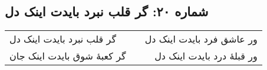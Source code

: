 \begin{center}
\section*{شماره ۲۰: گر قلب نبرد بایدت اینک دل}
\label{sec:020}
\begin{longtable}{l p{0.5cm} r}
گر قلب نبرد بایدت اینک دل
&&
ور عاشق فرد بایدت اینک دل
\\
گر کعبهٔ شوق بایدت اینک جان
&&
ور قبلهٔ درد بایدت اینک دل
\\
\end{longtable}
\end{center}
